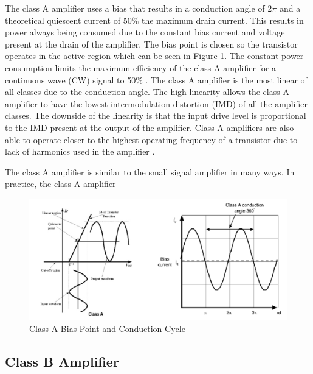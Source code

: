 The class A amplifier uses a bias that results in a conduction angle of $2\pi$ and a theoretical quiescent current of 50\% the maximum drain current. This results in power always being consumed due to the constant bias current and voltage present at the drain of the amplifier. The bias point is chosen so the transistor operates in the active region which can be seen in Figure \ref{classa_bias}. The constant power consumption limits the maximum efficiency of the class A amplifier for a continuous wave (CW) signal to 50\% \cite{C.Cripps2006}.
The class A amplifier is the most linear of all classes due to the conduction angle. The high linearity allows the class A amplifier to have the lowest intermodulation distortion (IMD) of all the amplifier classes. The downside of the linearity is that the input drive level is proportional to the IMD present at the output of the amplifier. Class A amplifiers are also able to operate closer to the highest operating frequency of a transistor due to lack of harmonics used in the amplifier \cite{}. %

The class A amplifier is similar to the small signal amplifier in many ways. In practice, the class A amplifier


\begin{figure}
  \centering
  \includegraphics[width=6in]{figures/classes/classa}
  \caption{Class A Bias Point and Conduction Cycle \cite{Rosu2001}}\label{classa_bias}
\end{figure}

\subsection{Class B Amplifier}

